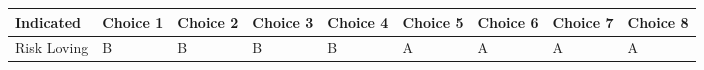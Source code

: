 \begin{tabular}{lllllllll}
\toprule
   Indicated & Choice 1 & Choice 2 & Choice 3 & Choice 4 & Choice 5 & Choice 6 & Choice 7 & Choice 8 \\
\midrule
 Risk Loving &        B &        B &        B &        B &        A &        A &        A &        A \\
\bottomrule
\end{tabular}

